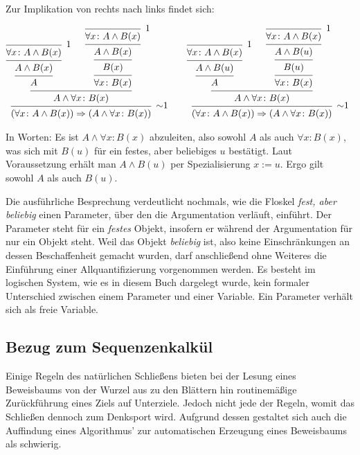 \begin{Beweis}
Zur Implikation von rechts nach links findet sich:
\begin{small}
\[
\begin{array}{@{}l@{\qquad}l}
\begin{prooftree}[center=false]
        \infer0[1]{\forall x\colon A\land B(x)}
      \infer1{A\land B(x)}
    \infer1{A}
          \infer0[1]{\forall x\colon A\land B(x)}
        \infer1{A\land B(x)}
      \infer1{B(x)}
    \infer1{\forall x\colon B(x)}
  \infer2{A\land\forall x\colon B(x)}
\infer1[$\sim$1]{(\forall x\colon A\land B(x))\cond (A\land\forall x\colon B(x))}
\end{prooftree}
&
\begin{prooftree}[center=false]
        \infer0[1]{\forall x\colon A\land B(x)}
      \infer1{A\land B(u)}
    \infer1{A}
          \infer0[1]{\forall x\colon A\land B(x)}
        \infer1{A\land B(u)}
      \infer1{B(u)}
    \infer1{\forall x\colon B(x)}
  \infer2{A\land\forall x\colon B(x)}
\infer1[$\sim$1]{(\forall x\colon A\land B(x))\cond (A\land\forall x\colon B(x))}
\end{prooftree}
\end{array}
\]
\end{small}%
In Worten: Es ist $A\land\forall x\colon B(x)$ abzuleiten, also
sowohl $A$ als auch $\forall x\colon B(x)$, was sich mit $B(u)$ für ein
festes, aber beliebiges $u$ bestätigt. Laut Voraussetzung erhält man
$A\land B(u)$ per Spezialisierung $x:=u$. Ergo gilt sowohl $A$ als
auch $B(u)$.\,\qedsymbol
\end{Beweis}

\noindent
Die ausführliche Besprechung verdeutlicht nochmals, wie die Floskel
\emph{fest, aber beliebig} einen Parameter, über den die Argumentation verläuft,
einführt. Der Parameter steht für ein \emph{festes} Objekt, insofern er
während der Argumentation für nur ein Objekt steht. Weil das Objekt
\emph{beliebig} ist, also keine Einschränkungen an dessen Beschaffenheit
gemacht wurden, darf anschließend ohne Weiteres die Einführung einer
Allquantifizierung vorgenommen werden. Es besteht im logischen System,
wie es in diesem Buch dargelegt wurde, kein formaler Unterschied
zwischen einem Parameter und einer Variable. Ein Parameter verhält sich
als freie Variable.

\subsection{Bezug zum Sequenzenkalkül}

Einige Regeln des natürlichen Schließens bieten bei der Lesung eines
Beweisbaums von der Wurzel aus zu den Blättern hin routinemäßige
Zurückführung eines Ziels auf Unterziele. Jedoch nicht jede der
Regeln, womit das Schließen dennoch zum Denksport wird. Aufgrund dessen
gestaltet sich auch die Auffindung eines Algorithmus' zur automatischen
Erzeugung eines Beweisbaums als schwierig.

